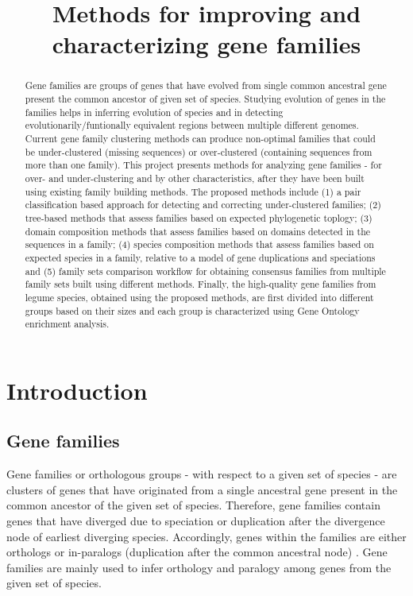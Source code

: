\documentclass{article}
\date{}
\begin{document}
	\title{Methods for improving and characterizing gene families}
	\maketitle
	\begin{abstract}
	Gene families are groups of genes that have evolved from single common ancestral gene present the common ancestor of given set of species. Studying evolution of genes in the families helps in inferring evolution of species and in detecting evolutionarily/funtionally equivalent regions between multiple different genomes. Current gene family clustering methods can produce non-optimal families that could be under-clustered (missing sequences) or over-clustered (containing sequences from more than one family). This project presents methods for analyzing gene families - for over- and under-clustering and by other characteristics, after they have been built using existing family building methods. The proposed methods include (1) a pair classification based approach for detecting and correcting under-clustered families; (2) tree-based methods that assess families based on expected phylogenetic toplogy; (3) domain composition methods that assess families based on domains detected in the sequences in a family; (4) species composition methods that assess families based on expected species in a family, relative to a model of gene duplications and speciations and (5) family sets comparison workflow for obtaining consensus families from multiple family sets built using different methods. Finally, the high-quality gene families from legume species, obtained using the proposed methods, are first divided into different groups based on their sizes and each group is characterized using Gene Ontology enrichment analysis.  
	\end{abstract}
	
	\section{Introduction}
		\subsection{Gene families}
		Gene families or orthologous groups - with respect to a given set of species - are clusters of genes that have originated from a single ancestral gene present in the common ancestor of the given set of species. Therefore, gene families contain genes that have diverged due to speciation or duplication after the divergence node of earliest diverging species. Accordingly, genes within the families are either orthologs or in-paralogs (duplication after the common ancestral node) \citep{fitch1970distinguishing,fitch2000homology, sonnhammer2002orthology}. Gene families are mainly used to infer orthology and paralogy among genes from the given set of species.
		
\end{document}
